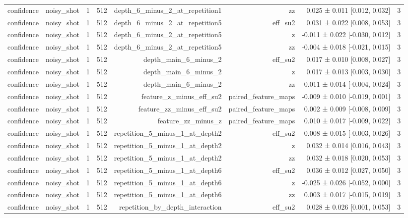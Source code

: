 \begin{table}
\begin{tabular}{lrrrrrrr}
confidence & noisy\_shot & 1 & 512 & depth\_6\_minus\_2\_at\_repetition1 & zz & 0.025 ± 0.011 [0.012, 0.032] & 3 \\
confidence & noisy\_shot & 1 & 512 & depth\_6\_minus\_2\_at\_repetition5 & eff\_su2 & 0.031 ± 0.022 [0.008, 0.053] & 3 \\
confidence & noisy\_shot & 1 & 512 & depth\_6\_minus\_2\_at\_repetition5 & z & -0.011 ± 0.022 [-0.030, 0.012] & 3 \\
confidence & noisy\_shot & 1 & 512 & depth\_6\_minus\_2\_at\_repetition5 & zz & -0.004 ± 0.018 [-0.021, 0.015] & 3 \\
confidence & noisy\_shot & 1 & 512 & depth\_main\_6\_minus\_2 & eff\_su2 & 0.017 ± 0.010 [0.008, 0.027] & 3 \\
confidence & noisy\_shot & 1 & 512 & depth\_main\_6\_minus\_2 & z & 0.017 ± 0.013 [0.003, 0.030] & 3 \\
confidence & noisy\_shot & 1 & 512 & depth\_main\_6\_minus\_2 & zz & 0.011 ± 0.014 [-0.004, 0.024] & 3 \\
confidence & noisy\_shot & 1 & 512 & feature\_z\_minus\_eff\_su2 & paired\_feature\_maps & -0.009 ± 0.010 [-0.019, 0.001] & 3 \\
confidence & noisy\_shot & 1 & 512 & feature\_zz\_minus\_eff\_su2 & paired\_feature\_maps & 0.002 ± 0.009 [-0.008, 0.009] & 3 \\
confidence & noisy\_shot & 1 & 512 & feature\_zz\_minus\_z & paired\_feature\_maps & 0.010 ± 0.017 [-0.009, 0.022] & 3 \\
confidence & noisy\_shot & 1 & 512 & repetition\_5\_minus\_1\_at\_depth2 & eff\_su2 & 0.008 ± 0.015 [-0.003, 0.026] & 3 \\
confidence & noisy\_shot & 1 & 512 & repetition\_5\_minus\_1\_at\_depth2 & z & 0.032 ± 0.014 [0.016, 0.043] & 3 \\
confidence & noisy\_shot & 1 & 512 & repetition\_5\_minus\_1\_at\_depth2 & zz & 0.032 ± 0.018 [0.020, 0.053] & 3 \\
confidence & noisy\_shot & 1 & 512 & repetition\_5\_minus\_1\_at\_depth6 & eff\_su2 & 0.036 ± 0.012 [0.027, 0.050] & 3 \\
confidence & noisy\_shot & 1 & 512 & repetition\_5\_minus\_1\_at\_depth6 & z & -0.025 ± 0.026 [-0.052, 0.000] & 3 \\
confidence & noisy\_shot & 1 & 512 & repetition\_5\_minus\_1\_at\_depth6 & zz & 0.003 ± 0.017 [-0.015, 0.019] & 3 \\
confidence & noisy\_shot & 1 & 512 & repetition\_by\_depth\_interaction & eff\_su2 & 0.028 ± 0.026 [0.001, 0.053] & 3 \\

\end{tabular}
\end{table}
